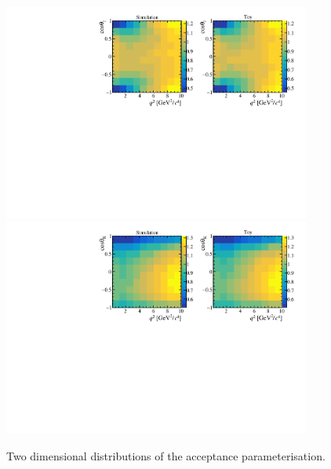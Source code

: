 \begin{figure}[!b]
 \centering
 \includegraphics[width=0.9\textwidth]{figs/kpimm/acceptance/2d/q2_ctl.pdf}
 \includegraphics[width=0.9\textwidth]{figs/kpimm/acceptance/2d/q2_ctk.pdf}
 \caption{Two dimensional distributions of the acceptance parameterisation.}
 \label{fig:acceptance:2d_1}
\end{figure}
 
